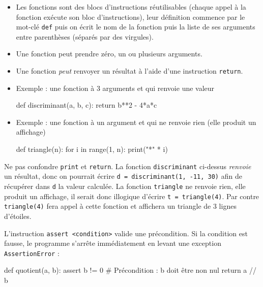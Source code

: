 \documentclass[11pt,a4paper]{article}
\begin{document}
\begin{tcolorbox}[left=0cm,title=\bf{\faPython \; Fonctions},colbacktitle=cfond]
\begin{itemize}
\item[\textbullet] Les fonctions sont des blocs d'instructions réutilisables (chaque appel à la fonction exécute son bloc d'instructions), leur définition commence par le mot-clé {\tt def} puis on écrit le nom de la fonction puis la liste de ses arguments entre parenthèses (séparés par des virgules).
\item[\textbullet] Une fonction peut prendre zéro, un ou plusieurs arguments.
\item[\textbullet] Une fonction \textit{peut} renvoyer un résultat à l'aide d'une instruction {\tt return}.
\item[\textbullet] Exemple : une fonction à 3 arguments et qui renvoie une valeur 
\begin{python}
def discriminant(a, b, c):
	return b**2 - 4*a*c
\end{python}
\item[\textbullet] Exemple : une fonction à un argument et qui ne renvoie rien (elle produit un affichage)
\begin{python}
def triangle(n):
	for i in range(1, n):
		print("*" * i) 
\end{python}
\end{itemize}
{\small \danger} Ne pas confondre {\tt print} et {\tt return}. La fonction {\tt discriminant} ci-dessus \textit{renvoie} un résultat, donc on pourrait écrire {\tt d = discriminant(1, -11, 30)} afin de récupérer dans {\tt d} la valeur calculée. La fonction {\tt triangle} ne renvoie rien, elle produit un affichage, il serait donc illogique d'écrire {\tt t = triangle(4)}. Par contre {\tt triangle(4)} fera appel à cette fonction et affichera un triangle de 3 lignes d'étoiles.
\end{tcolorbox}

\begin{tcolorbox}[left=0cm,title=\bf{\faPython \; Spécification et assertions},colbacktitle=cfond]
L'instruction \texttt{assert <condition>} valide une précondition. Si la condition est fausse, le programme s'arrête immédiatement en levant une exception \texttt{AssertionError} :
\begin{python}
def quotient(a, b):
	assert b != 0 # Précondition : b doit être non nul
	return a // b
\end{python}
\end{tcolorbox}
\end{document}
